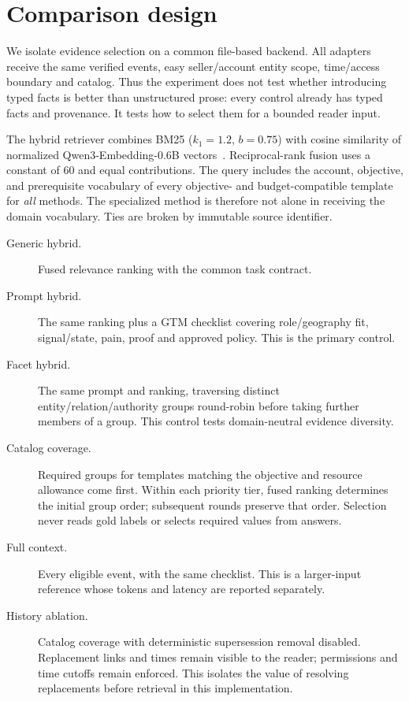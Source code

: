 \section{Comparison design}
\label{sec:methods}
We isolate evidence selection on a common file-based backend. All adapters receive the same verified events, easy seller/account entity scope, time/access boundary and catalog. Thus the experiment does not test whether introducing typed facts is better than unstructured prose: every control already has typed facts and provenance. It tests how to select them for a bounded reader input.

The hybrid retriever combines BM25 ($k_1=1.2$, $b=0.75$) with cosine similarity of normalized Qwen3-Embedding-0.6B vectors~\citep{p250605176}. Reciprocal-rank fusion uses a constant of 60 and equal contributions. The query includes the account, objective, and prerequisite vocabulary of every objective- and budget-compatible template for \emph{all} methods. The specialized method is therefore not alone in receiving the domain vocabulary. Ties are broken by immutable source identifier.

\begin{description}
\item[Generic hybrid.] Fused relevance ranking with the common task contract.
\item[Prompt hybrid.] The same ranking plus a GTM checklist covering role/geography fit, signal/state, pain, proof and approved policy. This is the primary control.
\item[Facet hybrid.] The same prompt and ranking, traversing distinct entity/relation/authority groups round-robin before taking further members of a group. This control tests domain-neutral evidence diversity.
\item[Catalog coverage.] Required groups for templates matching the objective and resource allowance come first. Within each priority tier, fused ranking determines the initial group order; subsequent rounds preserve that order. Selection never reads gold labels or selects required values from answers.
\item[Full context.] Every eligible event, with the same checklist. This is a larger-input reference whose tokens and latency are reported separately.
\item[History ablation.] Catalog coverage with deterministic supersession removal disabled. Replacement links and times remain visible to the reader; permissions and time cutoffs remain enforced. This isolates the value of resolving replacements before retrieval in this implementation.
\end{description}

